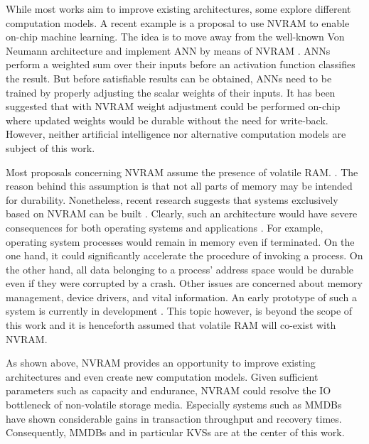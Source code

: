 While most works aim to improve existing architectures, some explore different
computation models. A recent example is a proposal to use \ac{NVRAM} to enable
on-chip machine learning. The idea is to move away from the well-known Von
Neumann architecture and implement \ac{ANN} by means of \ac{NVRAM}
\cite{fumarola2016accelerating}. \acp{ANN} perform a weighted sum over their
inputs before an activation function classifies the result. But before
satisfiable results can be obtained, \acp{ANN} need to be trained by properly
adjusting the scalar weights of their inputs. It has been suggested that with
\ac{NVRAM} weight adjustment could be performed on-chip where updated weights
would be durable without the need for write-back. However, neither artificial
intelligence nor alternative computation models are subject of this work.

Most proposals concerning \ac{NVRAM} assume the presence of volatile \ac{RAM}.
\cite{oukid2017data}. The reason behind this assumption is that not all parts of
memory may be intended for durability. Nonetheless, recent research suggests
that systems exclusively based on \ac{NVRAM} can be built
\cite{narayanan2012whole, courtland2016can}. Clearly, such an architecture would
have severe consequences for both operating systems and applications
\cite{bailey2011operating}. For example, operating system processes would remain
in memory even if terminated. On the one hand, it could significantly accelerate
the procedure of invoking a process. On the other hand, all data belonging to a
process' address space would be durable even if they were corrupted by a crash.
Other issues are concerned about memory management, device drivers, and vital
information. An early prototype of such a system is currently in development
\cite{courtland2016can}. This topic however, is beyond the scope of this work
and it is henceforth assumed that volatile \ac{RAM} will co-exist with
\ac{NVRAM}.

\newpage

As shown above, \ac{NVRAM} provides an opportunity to improve existing
architectures and even create new computation models. Given sufficient
parameters such as capacity and endurance, \ac{NVRAM} could resolve the \ac{IO}
bottleneck of non-volatile storage media. Especially systems such as \acp{MMDB}
have shown considerable gains in transaction throughput and recovery times.
Consequently, \acp{MMDB} and in particular \acp{KVS} are at the center of this
work.
